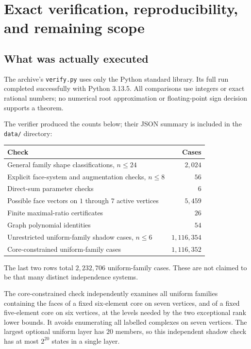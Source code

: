 \documentclass[11pt,letterpaper]{article}
\numberwithin{equation}{section}
\theoremstyle{definition}
\theoremstyle{remark}
\begin{document}
\section{Exact verification, reproducibility, and remaining scope}
\label{sec:verification}

\subsection{What was actually executed}
The archive's \texttt{verify.py} uses only the Python standard library.
Its full run completed successfully with Python 3.13.5. All comparisons
use integers or exact rational numbers; no numerical root approximation
or floating-point sign decision supports a theorem.

The verifier produced the counts below; their JSON summary is included
in the \texttt{data/} directory:
\begin{center}
\begin{tabular}{@{}l r@{}}
\toprule
Check & Cases\\
\midrule
General family shape classifications, $n\le24$ & $2{,}024$\\
Explicit face-system and augmentation checks, $n\le8$ & $56$\\
Direct-sum parameter checks & $6$\\
Possible face vectors on $1$ through $7$ active vertices & $5{,}459$\\
Finite maximal-ratio certificates & $26$\\
Graph polynomial identities & $54$\\
Unrestricted uniform-family shadow cases, $n\le6$ & $1{,}116{,}354$\\
Core-constrained uniform-family cases & $1{,}116{,}352$\\
\bottomrule
\end{tabular}
\end{center}
The last two rows total $2{,}232{,}706$ uniform-family cases.
These are not claimed to be that many distinct independence systems.

The core-constrained check independently examines all uniform families
containing the faces of a fixed six-element core on seven vertices, and
of a fixed five-element core on six vertices, at the levels needed by the
two exceptional rank lower bounds. It avoids enumerating all labelled
complexes on seven vertices. The largest optional uniform layer has
$20$ members, so this independent shadow check has at most $2^{20}$ states
in a single layer.
\end{document}
